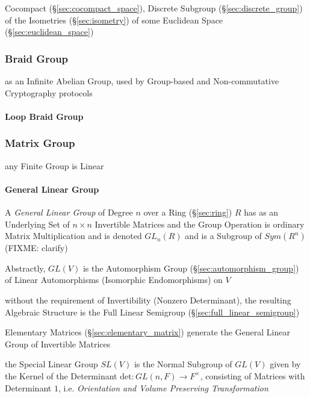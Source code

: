 Cocompact (\S\ref{sec:cocompact_space}), Discrete Subgroup
(\S\ref{sec:discrete_group}) of the Isometries (\S\ref{sec:isometry}) of some
Euclidean Space (\S\ref{sec:euclidean_space})



\subsubsection{Braid Group}\label{sec:braid_group}

as an Infinite Abelian Group, used by Group-based and Non-commutative
Cryptography protocols



\paragraph{Loop Braid Group}\label{sec:loop_braid_group}\hfill



\subsubsection{Matrix Group}\label{sec:matrix_group}

any Finite Group is Linear



\paragraph{General Linear Group}\label{sec:general_linear_group}\hfill

A \emph{General Linear Group} of Degree $n$ over a Ring (\S\ref{sec:ring}) $R$
has as an Underlying Set of $n \times n$ Invertible Matrices and the Group
Operation is ordinary Matrix Multiplication and is denoted $GL_n(R)$ and is a
Subgroup of $Sym(R^n)$ (FIXME: clarify)

Abstractly, $GL(V)$ is the Automorphism Group (\S\ref{sec:automorphism_group})
of Linear Automorphisms (Isomorphic Endomorphisms) on $V$

without the requirement of Invertibility (Nonzero Determinant), the resulting
Algebraic Structure is the Full Linear Semigroup
(\S\ref{sec:full_linear_semigroup})

Elementary Matrices (\S\ref{sec:elementary_matrix}) generate the General Linear
Group of Invertible Matrices

the Special Linear Group $SL(V)$ is the Normal Subgroup of $GL(V)$ given by the
Kernel of the Determinant $\mathrm{det} : GL(n,F) \rightarrow F^\times$,
consisting of Matrices with Determinant $1$, i.e. \emph{Orientation and Volume
  Preserving Transformation}

